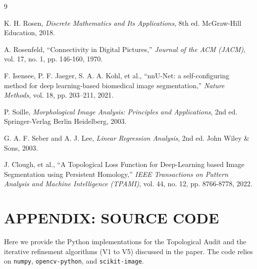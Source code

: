 \documentclass[twocolumn, 10pt, a4paper]{article}
\begin{document}
\begin{thebibliography}{9}

K. H. Rosen, \textit{Discrete Mathematics and Its Applications}, 8th ed. McGraw-Hill Education, 2018.

A. Rosenfeld, ``Connectivity in Digital Pictures,'' \textit{Journal of the ACM (JACM)}, vol. 17, no. 1, pp. 146-160, 1970.

F. Isensee, P. F. Jaeger, S. A. A. Kohl, et al., ``nnU-Net: a self-configuring method for deep learning-based biomedical image segmentation,'' \textit{Nature Methods}, vol. 18, pp. 203–211, 2021.

P. Soille, \textit{Morphological Image Analysis: Principles and Applications}, 2nd ed. Springer-Verlag Berlin Heidelberg, 2003.

G. A. F. Seber and A. J. Lee, \textit{Linear Regression Analysis}, 2nd ed. John Wiley \& Sons, 2003.

J. Clough, et al., ``A Topological Loss Function for Deep-Learning based Image Segmentation using Persistent Homology,'' \textit{IEEE Transactions on Pattern Analysis and Machine Intelligence (TPAMI)}, vol. 44, no. 12, pp. 8766-8778, 2022.

\end{thebibliography}

\clearpage
\onecolumn %
\appendix
\section*{APPENDIX: SOURCE CODE}
\renewcommand{\thesubsection}{A.\arabic{subsection}}

Here we provide the Python implementations for the Topological Audit and the iterative refinement algorithms (V1 to V5) discussed in the paper. The code relies on \texttt{numpy}, \texttt{opencv-python}, and \texttt{scikit-image}.
\end{document}
